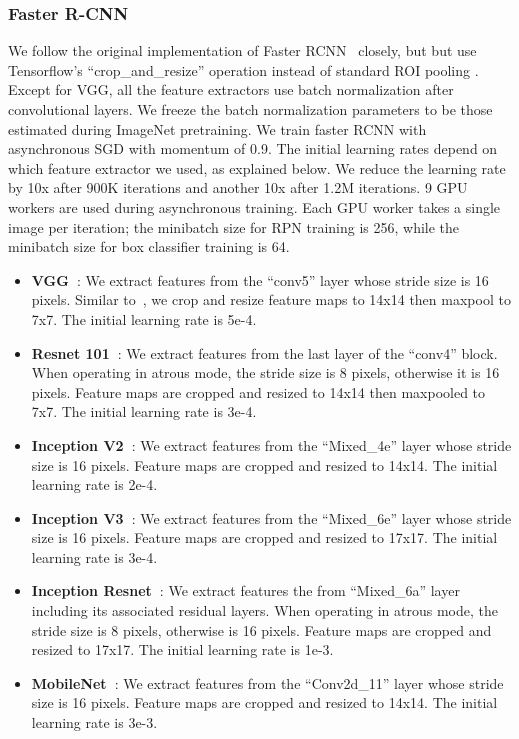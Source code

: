 \documentclass[10pt,twocolumn,letterpaper]{article}
\newcommand{\denselist}{
\itemsep -2pt\topsep-8pt\partopsep-8pt
}
\begin{document}
\subsubsection{Faster R-CNN}
We follow the original implementation of Faster RCNN~\cite{ren2015faster} closely, but but use Tensorflow's ``crop\_and\_resize'' operation instead of standard ROI pooling .
Except for VGG, all the feature extractors use batch normalization after convolutional layers. We freeze the batch normalization parameters to be those estimated during ImageNet pretraining.
We train faster RCNN with asynchronous SGD with momentum of 0.9. The initial learning rates depend on which feature extractor we used, as explained below. We reduce the learning rate by 10x after 900K iterations and another 10x after 1.2M iterations. 9 GPU workers are used during asynchronous training. Each GPU worker takes a single image per iteration; the minibatch size for RPN training is 256, while the minibatch size for box classifier training is 64.
\begin{itemize}\denselist
\item {\bf VGG~\cite{simonyan2014very}}: We extract features from the ``conv5'' layer whose stride size is 16 pixels. Similar to~\cite{dai2015instance}, we crop and resize feature maps to 14x14 then maxpool to 7x7. The initial learning rate is 5e-4.
\item {\bf Resnet 101~\cite{he2015deep}}: We extract features from the last layer of the ``conv4'' block. When operating in atrous mode, the stride size is 8 pixels, otherwise it is 16 pixels. Feature maps are cropped and resized to 14x14 then maxpooled to 7x7. The initial learning rate is 3e-4.
\item {\bf Inception V2~\cite{ioffe2015batch}}: We extract features from the ``Mixed\_4e'' layer whose stride size is 16 pixels. Feature maps are cropped and resized to 14x14. The initial learning rate is 2e-4.
\item {\bf Inception V3~\cite{szegedy2015rethinking}}: We extract features from the  ``Mixed\_6e'' layer whose stride size is 16 pixels. Feature maps are cropped and resized to 17x17. The initial learning rate is 3e-4.
\item {\bf Inception Resnet~\cite{szegedy2016inception}}: We extract features the  from ``Mixed\_6a'' layer including its associated residual layers. When operating in atrous mode, the stride size is 8 pixels, otherwise is 16 pixels. Feature maps are cropped and resized to 17x17. The initial learning rate is 1e-3.
\item {\bf MobileNet~\cite{howard17}}: We extract features from the  ``Conv2d\_11'' layer whose stride size is 16 pixels. Feature maps are cropped and resized to 14x14. The initial learning rate is 3e-3.
\end{itemize}
\end{document}
